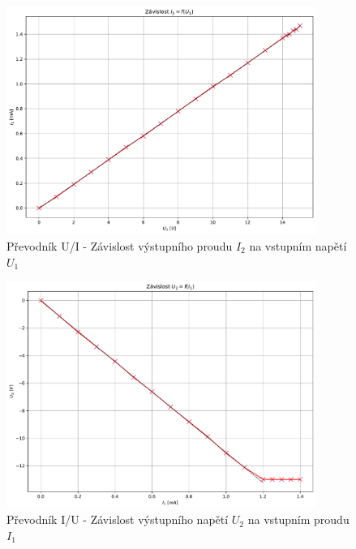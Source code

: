 \documentclass[a4paper, czech]{article}
\begin{document}
\begin{figure}[H]
    \centering
    \includegraphics[width=0.9\textwidth]{grafy/graf_prevodnik_UI.pdf}
    \caption{Převodník U/I - Závislost výstupního proudu $I_2$ na vstupním napětí $U_1$}
\end{figure}

\begin{figure}[H]
    \centering
    \includegraphics[width=0.9\textwidth]{grafy/graf_prevodnik_IU.pdf}
    \caption{Převodník I/U - Závislost výstupního napětí $U_2$ na vstupním proudu $I_1$}
\end{figure}
\end{document}
